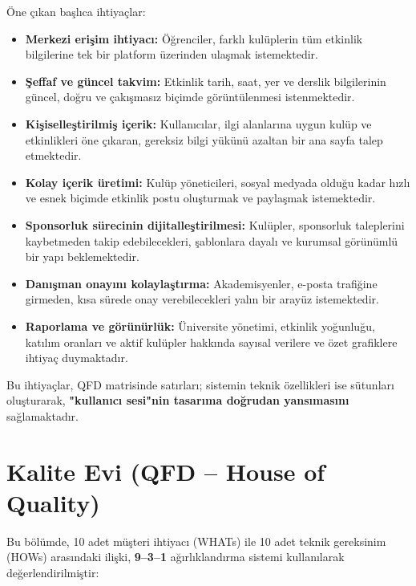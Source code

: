 \documentclass[a4paper,12pt]{report}
\begin{document}
Öne çıkan başlıca ihtiyaçlar:

\begin{itemize}
    \item \textbf{Merkezi erişim ihtiyacı:} Öğrenciler, farklı kulüplerin tüm etkinlik bilgilerine tek bir platform üzerinden ulaşmak istemektedir.

    \item \textbf{Şeffaf ve güncel takvim:} Etkinlik tarih, saat, yer ve derslik bilgilerinin güncel, doğru ve çakışmasız biçimde görüntülenmesi istenmektedir.

    \item \textbf{Kişiselleştirilmiş içerik:} Kullanıcılar, ilgi alanlarına uygun kulüp ve etkinlikleri öne çıkaran, gereksiz bilgi yükünü azaltan bir ana sayfa talep etmektedir.

    \item \textbf{Kolay içerik üretimi:} Kulüp yöneticileri, sosyal medyada olduğu kadar hızlı ve esnek biçimde etkinlik postu oluşturmak ve paylaşmak istemektedir.

    \item \textbf{Sponsorluk sürecinin dijitalleştirilmesi:} Kulüpler, sponsorluk taleplerini kaybetmeden takip edebilecekleri, şablonlara dayalı ve kurumsal görünümlü bir yapı beklemektedir.

    \item \textbf{Danışman onayını kolaylaştırma:} Akademisyenler, e-posta trafiğine girmeden, kısa sürede onay verebilecekleri yalın bir arayüz istemektedir.

    \item \textbf{Raporlama ve görünürlük:} Üniversite yönetimi, etkinlik yoğunluğu, katılım oranları ve aktif kulüpler hakkında sayısal verilere ve özet grafiklere ihtiyaç duymaktadır.
\end{itemize}

Bu ihtiyaçlar, QFD matrisinde satırları; sistemin teknik özellikleri ise sütunları oluşturarak, \textbf{"kullanıcı sesi"nin tasarıma doğrudan yansımasını} sağlamaktadır.

\section{Kalite Evi (QFD – House of Quality)}

Bu bölümde, 10 adet müşteri ihtiyacı (WHATs) ile 10 adet teknik gereksinim (HOWs) arasındaki ilişki, \textbf{9–3–1} ağırlıklandırma sistemi kullanılarak değerlendirilmiştir:
\end{document}
